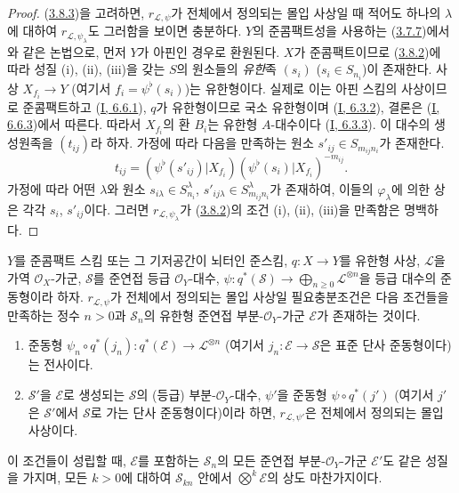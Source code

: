 
\begin{proof}
(\hyperref[II.3.8.3-ko]{3.8.3})을 고려하면,
$r_{\mathcal{L},\psi}$가 전체에서 정의되는 몰입 사상일 때 적어도 하나의
$\lambda$에 대하여 $r_{\mathcal{L},\psi_\lambda}$도 그러함을 보이면
충분하다. $Y$의 준콤팩트성을 사용하는
(\hyperref[II.3.7.7-ko]{3.7.7})에서와 같은 논법으로, 먼저 $Y$가
아핀인 경우로 환원된다. $X$가 준콤팩트이므로
(\hyperref[II.3.8.2-ko]{3.8.2})에 따라 성질 (i), (ii), (iii)을 갖는
$S$의 원소들의 \emph{유한}족 $(s_i)$ ($s_i\in S_{n_i}$)이 존재한다.
사상 $X_{f_i}\to Y$ (여기서 $f_i=\psi^\flat(s_i)$)는 유한형이다.
실제로 이는 아핀 스킴의 사상이므로 준콤팩트하고
(\hyperref[I.6.6.1-ko]{I, 6.6.1}), $q$가 유한형이므로 국소 유한형이며
(\hyperref[I.6.3.2-ko]{I, 6.3.2}), 결론은
(\hyperref[I.6.6.3-ko]{I, 6.6.3})에서 따른다. 따라서 $X_{f_i}$의 환
$B_i$는 유한형 $A$-대수이다
(\hyperref[I.6.3.3-ko]{I, 6.3.3}). 이 대수의 생성원족을 $(t_{ij})$라
하자. 가정에 따라 다음을 만족하는 원소
$s'_{ij}\in S_{m_{ij}n_i}$가 존재한다.
\[
  t_{ij}=(\psi^\flat(s'_{ij})|X_{f_i})
  (\psi^\flat(s_i)|X_{f_i})^{-m_{ij}}.
\]
가정에 따라 어떤 $\lambda$와 원소
$s_{i\lambda}\in S_{n_i}^\lambda$,
$s'_{ij\lambda}\in S_{m_{ij}n_i}^\lambda$가 존재하여, 이들의
$\varphi_\lambda$에 의한 상은 각각 $s_i$, $s'_{ij}$이다. 그러면
$r_{\mathcal{L},\psi_\lambda}$가
(\hyperref[II.3.8.2-ko]{3.8.2})의 조건 (i), (ii), (iii)을 만족함은
명백하다.
\end{proof}

\begin{proposition}[3.8.5]
\label{II.3.8.5-ko}
$Y$를 준콤팩트 스킴 또는 그 기저공간이 뇌터인 준스킴,
$q:X\to Y$를 유한형 사상, $\mathcal{L}$을 가역
$\mathcal{O}_X$-가군, $\mathcal{S}$를 준연접 등급
$\mathcal{O}_Y$-대수,
$\psi:q^*(\mathcal{S})\to\bigoplus_{n\geq0}\mathcal{L}^{\otimes n}$을
등급 대수의 준동형이라 하자. $r_{\mathcal{L},\psi}$가 전체에서
정의되는 몰입 사상일 필요충분조건은 다음 조건들을 만족하는 정수
$n>0$과 $\mathcal{S}_n$의 유한형 준연접 부분-$\mathcal{O}_Y$-가군
$\mathcal{E}$가 존재하는 것이다.
\begin{enumerate}
  \item[a)] 준동형
    $\psi_n\circ q^*(j_n):q^*(\mathcal{E})\to\mathcal{L}^{\otimes n}$
    (여기서 $j_n:\mathcal{E}\to\mathcal{S}$은 표준 단사 준동형이다)는
    전사이다.
  \item[b)] $\mathcal{S}'$을 $\mathcal{E}$로 생성되는
    $\mathcal{S}$의 (등급) 부분-$\mathcal{O}_Y$-대수,
    $\psi'$을 준동형 $\psi\circ q^*(j')$ (여기서 $j'$은
    $\mathcal{S}'$에서 $\mathcal{S}$로 가는 단사 준동형이다)이라 하면,
    $r_{\mathcal{L},\psi'}$은 전체에서 정의되는 몰입 사상이다.
\end{enumerate}

이 조건들이 성립할 때, $\mathcal{E}$를 포함하는 $\mathcal{S}_n$의
모든 준연접 부분-$\mathcal{O}_Y$-가군 $\mathcal{E}'$도 같은 성질을
가지며, 모든 $k>0$에 대하여 $\mathcal{S}_{kn}$ 안에서
$\bigotimes^k\mathcal{E}$의 상도 마찬가지이다.
\end{proposition}

